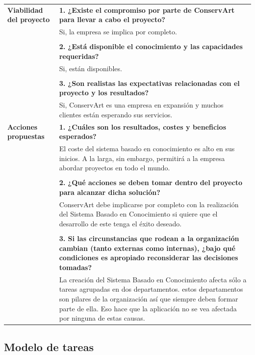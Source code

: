 \documentclass[a4paper,11pt]{article}
\begin{document}
			\begin{center}
				\begin{tabular}{| p{4.5cm} | p{7cm} |}
					\hline
					\textbf{Viabilidad del proyecto} & 
					\textbf{1. ¿Existe el compromiso por parte de ConservArt para llevar a
					cabo el proyecto?}\\
					& Si, la empresa se implica por completo.\\
					& \\
					& \textbf{2. ¿Está disponible el conocimiento y las capacidades
					requeridas?}\\
					& Si, están disponibles.\\
					& \\
					& \textbf{3. ¿Son realistas las expectativas relacionadas con el proyecto
					y los resultados?}\\
					& Si, ConservArt es una empresa en expansión y muchos clientes están
					esperando sus servicios.\\
					\hline
					\textbf{Acciones propuestas} & 
					\textbf{1. ¿Cuáles son los resultados, costes y beneficios esperados?}\\
					& El coste del sistema basado en conocimiento es alto en sus inicios. A la
					larga, sin embargo, permitirá a la empresa abordar proyectos en todo el
					mundo.\\
					& \\
					& \textbf{2. ¿Qué acciones se deben tomar dentro del proyecto para alcanzar
					dicha solución?}\\
					& ConservArt debe implicarse por completo con la realización del Sistema
					Basado en Conocimiento si quiere que el desarrollo de este tenga el éxito deseado.\\
					& \\
					& \textbf{3. Si las circunstancias que rodean a la organización cambian
					(tanto externas como internas), ¿bajo qué condiciones es apropiado
					reconsiderar las decisiones tomadas?}\\
					& La creación del Sistema Basado en Conocimiento afecta sólo a tareas agrupadas en dos departamentos. estos departamentos son pilares de la organización así que siempre deben formar parte de ella. Eso hace que la aplicación no se vea afectada por ninguna de estas causas.\\
					\hline
				\end{tabular}
			\end{center}
		\newpage
		\subsection{Modelo de tareas}
\end{document}
